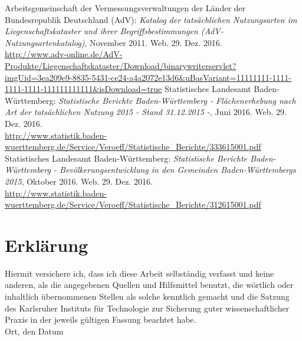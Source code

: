 \documentclass[12pt,a4paper]{scrartcl}
\begin{document}
\newpage
\begin{thebibliography}{50}
 Arbeitsgemeinschaft der Vermessungsverwaltungen der Länder der Bundesrepublik Deutschland (AdV): \textit{Katalog der tatsächlichen Nutzungsarten im Liegenschaftskataster und ihrer Begriffsbestimmungen (AdV-Nutzungsartenkatalog)}, November 2011. Web. 29. Dez. 2016.\\ \url{http://www.adv-online.de/AdV-Produkte/Liegenschaftskataster/Download/binarywriterservlet?imgUid=3ea209e9-8835-5431-ce24-a4a2072e13d6&uBasVariant=11111111-1111-1111-1111-111111111111&isDownload=true}
 Statistisches Landesamt Baden-Württemberg: \textit{Statistische Berichte Baden-Württemberg - Flächenerhebung nach Art der tatsächlichen Nutzung 2015 - Stand 31.12.2015 -}, Juni 2016. Web. 29. Dez. 2016. \\ \url{http://www.statistik.baden-wuerttemberg.de/Service/Veroeff/Statistische_Berichte/333615001.pdf} 
 Statistisches Landesamt Baden-Württemberg: \textit{Statistische Berichte Baden-Württemberg - Bevölkerungsentwicklung in den Gemeinden Baden-Württembergs 2015}, Oktober 2016. Web. 29. Dez. 2016. \\ \url{http://www.statistik.baden-wuerttemberg.de/Service/Veroeff/Statistische_Berichte/312615001.pdf} 

	


 
\end{thebibliography}
 
      

\newpage
  
 \thispagestyle{empty}


\vspace*{8cm}


\section*{Erklärung}

Hiermit versichere ich, dass ich diese Arbeit selbständig verfasst und keine anderen, als die angegebenen Quellen und Hilfsmittel benutzt, die wörtlich oder inhaltlich übernommenen Stellen als solche kenntlich gemacht und die Satzung des Karlsruher Instituts für Technologie zur Sicherung guter wissenschaftlicher Praxis in der jeweils gültigen Fassung beachtet habe. \\[2ex] 

\noindent
Ort, den Datum\\[5ex]

\end{document}
